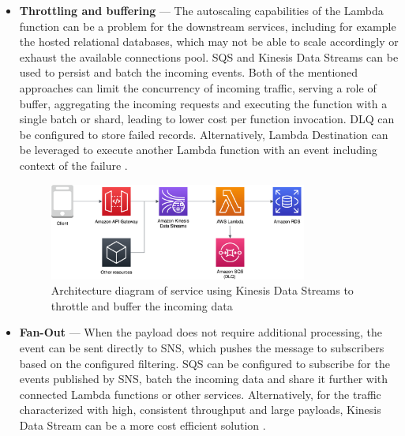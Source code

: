 \begin{itemize}
   \item \textbf{Throttling and buffering} --- The autoscaling capabilities of the Lambda function can be a problem for the downstream services, including for example the hosted relational databases, which may not be able to scale accordingly or exhaust the available connections pool.
   SQS and Kinesis Data Streams can be used to persist and batch the incoming events.
   Both of the mentioned approaches can limit the concurrency of incoming traffic, serving a role of buffer, aggregating the incoming requests and executing the function with a single batch or shard, leading to lower cost per function invocation.
   DLQ can be configured to store failed records. Alternatively, Lambda Destination can be leveraged to execute another Lambda function with an event including context of the failure \cite{ServerlessArchitecturalPatternsAndBestPractices}.
  
   \begin{figure}[H]
       \centering
       \includegraphics[width=0.8\textwidth]{assets/04-serverless-for-web-apps/buffer.png}
       \caption{Architecture diagram of service using Kinesis Data Streams to throttle and buffer the incoming data}
       \label{fig:throttling-and-buffering-diagram}
   \end{figure}

   \item \textbf{Fan-Out} --- When the payload does not require additional processing, the event can be sent directly to SNS, which pushes the message to subscribers based on the configured filtering. SQS can be configured to subscribe for the events published by SNS, batch the incoming data and share it further with connected Lambda functions or other services.
   Alternatively, for the traffic characterized with high, consistent throughput and large payloads, Kinesis Data Stream can be a more cost efficient solution \cite{ServerlessArchitecturalPatternsAndBestPractices}.


\end{itemize}
